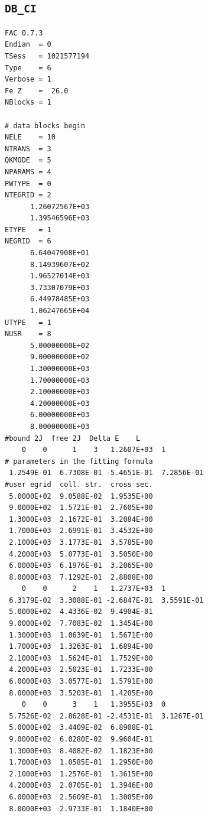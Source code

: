 \documentclass[twoside,letterpaper]{refrep}
\begin{document}
\subsection{\texttt{DB\_CI}}
\begin{verbatim}
FAC 0.7.3
Endian	= 0
TSess	= 1021577194
Type	= 6
Verbose	= 1
Fe Z	=  26.0
NBlocks	= 1

# data blocks begin
NELE	= 10
NTRANS	= 3
QKMODE	= 5
NPARAMS	= 4
PWTYPE	= 0
NTEGRID	= 2
	  1.26072567E+03
	  1.39546596E+03
ETYPE	= 1
NEGRID	= 6
	  6.64047908E+01
	  8.14939607E+02
	  1.96527014E+03
	  3.73307079E+03
	  6.44978485E+03
	  1.06247665E+04
UTYPE	= 1
NUSR	= 8
	  5.00000000E+02
	  9.00000000E+02
	  1.30000000E+03
	  1.70000000E+03
	  2.10000000E+03
	  4.20000000E+03
	  6.00000000E+03
	  8.00000000E+03
#bound 2J  free 2J  Delta E    L
    0	 0	    1	 3	 1.2607E+03	 1
# parameters in the fitting formula
 1.2549E-01  6.7308E-01 -5.4651E-01  7.2856E-01 
#user egrid  coll. str.  cross sec.
 5.0000E+02	 9.0588E-02	 1.9535E+00
 9.0000E+02	 1.5721E-01	 2.7605E+00
 1.3000E+03	 2.1672E-01	 3.2084E+00
 1.7000E+03	 2.6991E-01	 3.4532E+00
 2.1000E+03	 3.1773E-01	 3.5785E+00
 4.2000E+03	 5.0773E-01	 3.5050E+00
 6.0000E+03	 6.1976E-01	 3.2065E+00
 8.0000E+03	 7.1292E-01	 2.8808E+00
    0	 0	    2	 1	 1.2737E+03	 1
 6.3179E-02  3.3088E-01 -2.6847E-01  3.5591E-01 
 5.0000E+02	 4.4336E-02	 9.4904E-01
 9.0000E+02	 7.7083E-02	 1.3454E+00
 1.3000E+03	 1.0639E-01	 1.5671E+00
 1.7000E+03	 1.3263E-01	 1.6894E+00
 2.1000E+03	 1.5624E-01	 1.7529E+00
 4.2000E+03	 2.5023E-01	 1.7233E+00
 6.0000E+03	 3.0577E-01	 1.5791E+00
 8.0000E+03	 3.5203E-01	 1.4205E+00
    0	 0	    3	 1	 1.3955E+03	 0
 5.7526E-02  2.8628E-01 -2.4531E-01  3.1267E-01 
 5.0000E+02	 3.4409E-02	 6.8908E-01
 9.0000E+02	 6.0280E-02	 9.9604E-01
 1.3000E+03	 8.4082E-02	 1.1823E+00
 1.7000E+03	 1.0585E-01	 1.2950E+00
 2.1000E+03	 1.2576E-01	 1.3615E+00
 4.2000E+03	 2.0705E-01	 1.3946E+00
 6.0000E+03	 2.5609E-01	 1.3005E+00
 8.0000E+03	 2.9733E-01	 1.1840E+00
\end{verbatim}
\end{document}
